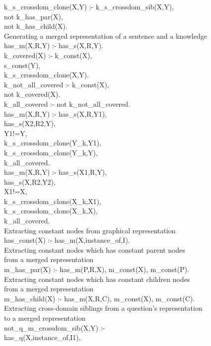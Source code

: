 k\_s\_crossdom\_clone(X,Y) :- k\_s\_crossdom\_sib(X,Y),\\
not k\_has\_par(X),\\
not k\_has\_child(X).\\
Generating a merged representation of a sentence and a knowledge\\
has\_m(X,R,Y) :- has\_s(X,R,Y).\\
k\_covered(X) :- k\_const(X),\\
s\_const(Y),\\
k\_s\_crossdom\_clone(X,Y).\\
k\_not\_all\_covered :- k\_const(X),\\
not k\_covered(X).\\
k\_all\_covered :- not k\_not\_all\_covered.\\
has\_m(X,R,Y) :- has\_s(X,R,Y1),\\
has\_s(X2,R2,Y),\\
Y1!=Y,\\
k\_s\_crossdom\_clone(Y\_k,Y1),\\
k\_s\_crossdom\_clone(Y\_k,Y),\\
k\_all\_covered.\\
has\_m(X,R,Y) :- has\_s(X1,R,Y),\\
has\_s(X,R2,Y2),\\
X1!=X,\\
k\_s\_crossdom\_clone(X\_k,X1),\\
k\_s\_crossdom\_clone(X\_k,X),\\
k\_all\_covered.\\
Extracting constant nodes from graphical representation\\
has\_const(X) :- has\_m(X,instance\_of,I).\\
Extracting constant nodes which has constant parent nodes\\
from a merged representation\\
m\_has\_par(X) :- has\_m(P,R,X), m\_const(X), m\_const(P).\\
Extracting constant nodes which has constant children nodes\\
from a merged representation\\
m\_has\_child(X) :- has\_m(X,R,C), m\_const(X), m\_const(C).\\
Extracting cross-domain siblings from a question’s representation\\
to a merged representation\\
not\_q\_m\_crossdom\_sib(X,Y) :-\\
has\_q(X,instance\_of,I1),\\
